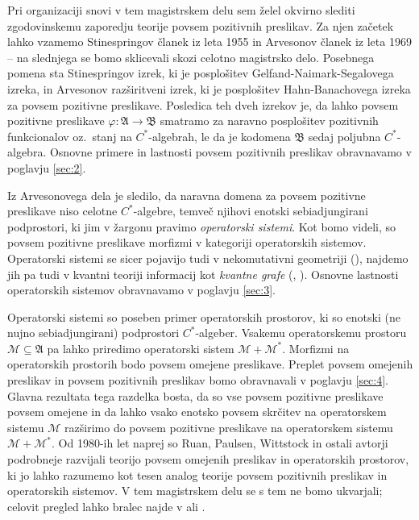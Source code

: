 Pri organizaciji snovi v tem magistrskem delu sem želel okvirno slediti zgodovinskemu zaporedju teorije povsem pozitivnih preslikav.
Za njen začetek lahko vzamemo Stinespringov članek \cite{stinespring1955} iz leta 1955
in Arvesonov članek \cite{arveson1969} iz leta 1969 -- na slednjega se bomo sklicevali skozi celotno magistrsko delo.
Posebnega pomena sta Stinespringov izrek, ki je posplošitev Gelfand-Naimark-Segalovega izreka,
in Arvesonov razširitveni izrek, ki je posplošitev Hahn-Banachovega izreka za povsem pozitivne preslikave.
Posledica teh dveh izrekov je, da lahko povsem pozitivne preslikave $\varphi: \mathfrak{A} \to \mathfrak{B}$ smatramo za naravno posplošitev pozitivnih funkcionalov oz.~stanj
na $C^*$-algebrah, le da je kodomena $\mathfrak{B}$ sedaj poljubna $C^*$-algebra. Osnovne primere in lastnosti povsem pozitivnih preslikav 
obravnavamo v poglavju \ref{sec:2}.

Iz Arvesonovega dela je sledilo, da naravna domena za povsem pozitivne preslikave niso celotne $C^*$-algebre,
temveč njihovi enotski sebiadjungirani podprostori, ki jim v žargonu pravimo \emph{operatorski sistemi}.
Kot bomo videli, so povsem pozitivne preslikave morfizmi v kategoriji operatorskih sistemov.
Operatorski sistemi se sicer pojavijo tudi v nekomutativni geometriji %
(\cite{connes2021}), najdemo jih pa tudi v kvantni teoriji informacij kot \emph{kvantne grafe} (\cite{weaver2021}, \cite{duanseveriniwinter2013}).
Osnovne lastnosti operatorskih sistemov obravnavamo v poglavju \ref{sec:3}.

Operatorski sistemi so poseben primer operatorskih prostorov,
ki so enotski (ne nujno sebiadjungirani) podprostori $C^*$-algeber.
Vsakemu operatorskemu prostoru $\mathcal{M} \subseteq \mathfrak{A}$ 
pa lahko priredimo operatorski sistem $\mathcal{M} + \mathcal{M}^*$.
Morfizmi na operatorskih prostorih bodo povsem omejene preslikave.
Preplet povsem omejenih preslikav in povsem pozitivnih preslikav bomo obravnavali v poglavju \ref{sec:4}.
Glavna rezultata tega razdelka bosta, da so vse povsem pozitivne preslikave povsem omejene 
in da lahko vsako enotsko povsem skrčitev na operatorskem sistemu $\mathcal{M}$
razširimo do povsem pozitivne preslikave na operatorskem sistemu $\mathcal{M} + \mathcal{M}^*$.
Od 1980-ih let naprej so Ruan, Paulsen, Wittstock in ostali avtorji podrobneje razvijali
teorijo povsem omejenih preslikav in operatorskih prostorov, ki jo 
lahko razumemo kot tesen analog teorije povsem pozitivnih preslikav in operatorskih sistemov.
V tem magistrskem delu se s tem ne bomo ukvarjali; celovit pregled lahko bralec najde v \cite{paulsen2002} ali
\cite{pisier2003}.

